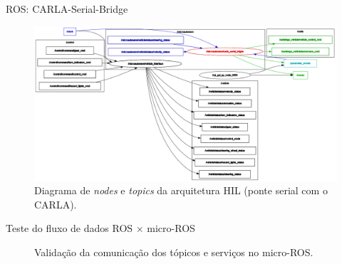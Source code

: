 \documentclass{if-beamer}
\begin{document}
\begin{frame}{ROS: CARLA-Serial-Bridge}

\begin{figure}[H]
	\centering
	\includegraphics[width=0.95\linewidth]{ros_graph_serial}
	\caption{Diagrama de \textit{nodes} e \textit{topics} da arquitetura HIL (ponte serial com o CARLA).}
	\label{fig:ros_graph_serial}
\end{figure}

\end{frame}


\begin{frame}{Teste do fluxo de dados ROS $\times$ micro-ROS}

\begin{figure}[H]
	\centering
	\caption{Validação da comunicação dos tópicos e serviços no micro-ROS.}
	\label{fig:teste_micro}
\end{figure}

\end{frame}
\end{document}
